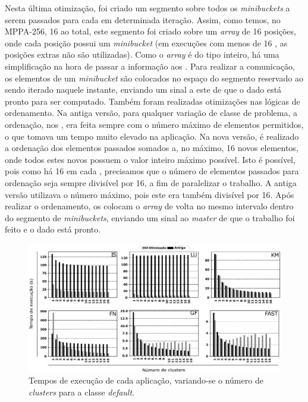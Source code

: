 \documentclass[a4paper,11pt]{article}
\newcommand{\mppa}{MPPA-256\xspace}
\begin{document}
Nesta última otimização, foi criado um segmento sobre todos os \textit{minibuckets} a serem passados para cada \cc em determinada iteração. Assim, como temos, no \mppa, 16 \ccs ao total, este segmento foi criado sobre um \textit{array} de 16 posições, onde cada posição possui um \textit{minibucket} (em execuções com menos de 16 \ccs, as posições extras não são utilizadas). Como o \textit{array} é do tipo inteiro, há uma simplificação na hora de passar a informação aos \ccs. Para realizar a comunicação, os elementos de um \textit{minibucket} são colocados no espaço do segmento reservado ao \cc sendo iterado naquele instante, enviando um sinal a este \cc de que o dado está pronto para ser computado. Também foram realizadas otimizações nas lógicas de ordenamento. Na antiga versão, para qualquer variação de classe de problema, a ordenação, nos \ccs, era feita sempre com o número máximo de elementos permitidos, o que tomava um tempo muito elevado na aplicação. Na nova versão, é realizado a ordenação dos elementos passados somados a, no máximo, 16 novos elementos, onde todos estes novos possuem o valor inteiro máximo possível. Isto é possível, pois como há 16 \pes em cada \cc, precisamos que o número de elementos passados para ordenação seja sempre divisível por 16, a fim de paralelizar o trabalho. A antiga versão utilizava o número máximo, pois este era também divisível por 16. Após realizar o ordenamento, os \ccs colocam o \textit{array} de volta no mesmo intervalo dentro do segmento de \textit{minibuckets}, enviando um sinal ao \textit{master} de que o trabalho foi feito e o dado está pronto.

\begin{figure}[t]
\centering
\includegraphics[width=15cm, keepaspectratio]{figs/execution-time.pdf}
\caption{Tempos de execução de cada aplicação, variando-se o número de \textit{clusters} para a classe \textit{default}.}\par
\label{fig:executiontime}
\end{figure}
\end{document}

